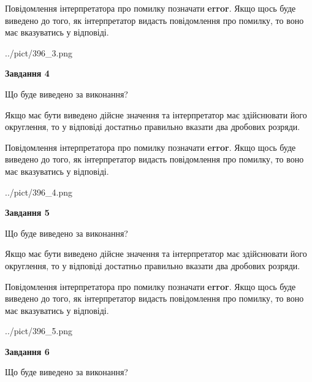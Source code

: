 \documentclass[12pt, ukrainian]{article}
\begin{document}
{\begin {Large}
Повідомлення інтерпретатора про помилку позначати \textbf{error}.
Якщо щось буде виведено до того, як інтерпретатор видасть повідомлення про помилку, 
то воно має вказуватись у відповіді. \par

\begin{center}
	{../pict/396_3.png}
\end{center}
\newpage

{\begin {center}\textbf{Завдання 4}\end {center}}\par
Що буде виведено за виконання? \par

Якщо має бути виведено дійсне значення та інтерпретатор має здійснювати його округлення, 
то у відповіді достатньо правильно вказати два дробових розряди.

Повідомлення інтерпретатора про помилку позначати \textbf{error}.
Якщо щось буде виведено до того, як інтерпретатор видасть повідомлення про помилку, 
то воно має вказуватись у відповіді. \par

\begin{center}
	{../pict/396_4.png}
\end{center}
\newpage

{\begin {center}\textbf{Завдання 5}\end {center}}\par
Що буде виведено за виконання? \par

Якщо має бути виведено дійсне значення та інтерпретатор має здійснювати його округлення, 
то у відповіді достатньо правильно вказати два дробових розряди.

Повідомлення інтерпретатора про помилку позначати \textbf{error}.
Якщо щось буде виведено до того, як інтерпретатор видасть повідомлення про помилку, 
то воно має вказуватись у відповіді. \par

\begin{center}
	{../pict/396_5.png}
\end{center}
\newpage

{\begin {center}\textbf{Завдання 6}\end {center}}\par
Що буде виведено за виконання? \par


\end{Large}}
\end{document}
